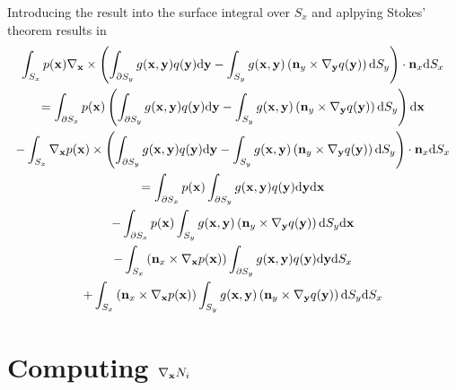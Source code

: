\documentclass{article}
\newcommand{\td}{\mathrm{d}}
\begin{document}
%
Introducing the result into the surface integral over $S_x$ and aplpying Stokes' theorem results in
%
\begin{multline}
\int_{S_x}
p({\bf x})
\nabla_{\bf x} \times
\left(\int_{\partial S_y} 
g({\bf x}, {\bf y}) q({\bf y})
\td {\bf y} 
-
\int_{S_y} g({\bf x}, {\bf y}) \left({\bf n}_y  \times \nabla_{\bf y} q({\bf y}) \right)
\td S_y
\right)
\cdot {\bf n}_x
\td S_x
\\
=
\int_{\partial S_x}
p({\bf x})
\left(\int_{\partial S_y} 
g({\bf x}, {\bf y}) q({\bf y})
\td {\bf y} 
-
\int_{S_y} g({\bf x}, {\bf y}) \left({\bf n}_y  \times \nabla_{\bf y} q({\bf y}) \right)
\td S_y
\right)
\td {\bf x}
\\
-
\int_{S_x}
\nabla_{\bf x} p({\bf x})
\times
\left(\int_{\partial S_y} 
g({\bf x}, {\bf y}) q({\bf y})
\td {\bf y} 
-
\int_{S_y} g({\bf x}, {\bf y}) \left({\bf n}_y  \times \nabla_{\bf y} q({\bf y}) \right)
\td S_y
\right)
\cdot {\bf n}_x
\td S_x
\\
=
\int_{\partial S_x}
p({\bf x})
\int_{\partial S_y} 
g({\bf x}, {\bf y}) q({\bf y})
\td {\bf y} 
\td {\bf x}
\\
-
\int_{\partial S_x}
p({\bf x})
\int_{S_y} g({\bf x}, {\bf y}) \left({\bf n}_y  \times \nabla_{\bf y} q({\bf y}) \right)
\td S_y
\td {\bf x}
\\
-
\int_{S_x}
\left({\bf n}_x \times \nabla_{\bf x} p({\bf x})\right)
\int_{\partial S_y} 
g({\bf x}, {\bf y}) q({\bf y})
\td {\bf y} 
\td S_x
\\
+
\int_{S_x}
\left({\bf n}_x \times \nabla_{\bf x} p({\bf x})\right)
\int_{S_y} g({\bf x}, {\bf y}) \left({\bf n}_y  \times \nabla_{\bf y} q({\bf y}) \right)
\td S_y
\td S_x
\end{multline}

\section{Computing $\nabla_{\bf x} N_i$}
\end{document}
